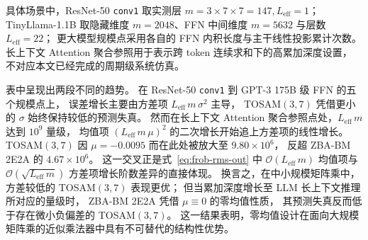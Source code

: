 \documentclass[12pt,a4paper,UTF8]{article}
\begin{document}
具体场景中，ResNet-50 \texttt{conv1} 取实测层 $m=3\times7\times7=147,L_{\mathrm{eff}}=1$；
TinyLlama-1.1B 取隐藏维度 $m=2048$、FFN 中间维度 $m=5632$ 与层数 $L_{\mathrm{eff}}=22$；
更大模型规模点采用各自的 FFN 内积长度与主干线性投影累计次数。
长上下文 Attention 聚合参照用于表示跨 token 连续求和下的高累加深度设置，
不对应本文已经完成的周期级系统仿真。

\begin{table}[htbp]
    \centering
    \caption{不同矩阵乘规模下的预测每元素输出 RMS 失真对比}
    \label{tab:frob-llm}
    \small
    \setlength{\tabcolsep}{5pt}
\end{table}

表中呈现出两段不同的趋势。
在 ResNet-50 \texttt{conv1} 到 GPT-3 175B 级 FFN 的五个规模点上，
误差增长主要由方差项 $L_{\mathrm{eff}}\,m\,\sigma^2$ 主导，
TOSAM$(3,7)$ 凭借更小的 $\sigma$ 始终保持较低的预测失真。
然而在长上下文 Attention 聚合参照点处，$L_{\mathrm{eff}}\,m$ 达到 $10^9$ 量级，
均值项 $(L_{\mathrm{eff}}\,m\,\mu)^2$ 的二次增长开始追上方差项的线性增长。
TOSAM$(3,7)$ 因 $\mu{=}{-}0.0095$ 而在此处被放大至 $9.80\times10^{6}$，
反超 ZBA-BM 2E2A 的 $4.67\times10^{6}$。
这一交叉正是式~\eqref{eq:frob-rms-out} 中 $\mathcal{O}(L_{\mathrm{eff}}\,m)$
均值项与 $\mathcal{O}(\sqrt{L_{\mathrm{eff}}\,m})$ 方差项增长阶数差异的直接体现。
换言之，在中小规模矩阵乘中，方差较低的 TOSAM$(3,7)$ 表现更优；
但当累加深度增长至 LLM 长上下文推理所对应的量级时，
ZBA-BM 2E2A 凭借 $\mu{\equiv}0$ 的零均值性质，
其预测失真反而低于存在微小负偏差的 TOSAM$(3,7)$。
这一结果表明，零均值设计在面向大规模矩阵乘的近似乘法器中具有不可替代的结构性优势。
\end{document}
